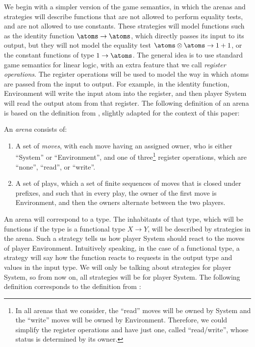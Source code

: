 We begin with a simpler version of the game semantics, in which the arenas and strategies will describe functions that are not allowed to perform equality tests, and are not allowed to use constants. These strategies will model functions such as the identity function $\atoms \to \atoms$, which directly passes its input to its output, but they  will not model the equality test $\atoms \otimes \atoms \to 1 + 1$, or the constant functions of type $1 \to \atoms$. The general idea is to use standard game semantics for linear logic, with an extra feature that we call \emph{register operations}. The register operations will be used to model the way in which atoms are passed from the input to output. For example, in the identity function,  Environment will  write the input atom into the register, and then player System will read the output atom from that register. The following definition of an arena is based on the definition from \cite[p.4]{abramsky2013semantics}, slightly
adapted for the context of this paper:
\begin{definition}[Arena] \label{def:arena}
    An \emph{arena} consists of:
    \begin{enumerate}
        \item A set of \emph{moves}, with each move having an assigned owner, who is either ``System'' or ``Environment'', and one of three\footnote{\label{footnote:read-write} In all arenas that we consider, the ``read'' moves will be owned by System and the ``write'' moves will be owned by Environment. Therefore, we could simplify the register operations and have just one, called ``read/write'', whose status is determined by its owner. 
        } register operations, which are ``none'', ``read'', or ``write''.
                \item A set of plays, which a set of finite sequences of moves that is closed under prefixes, and such that in every play, the owner of the first move is Environment, and then the owners alternate between the two players.
    \end{enumerate}
\end{definition}




An arena will correspond to a type. The inhabitants of that type, which will be  functions if the type is a functional type $X \to Y$, will be described by strategies in the arena. Such a strategy tells us how player System should react to the moves of player Environment. Intuitively speaking, in the case of a functional type, a strategy will say how the function reacts to requests in the output type and values in the input type. We will only be talking about strategies for player System, so from now on, all strategies will be for player System. The following definition corresponds to the definition from \cite[p.5]{abramsky2013semantics}:


